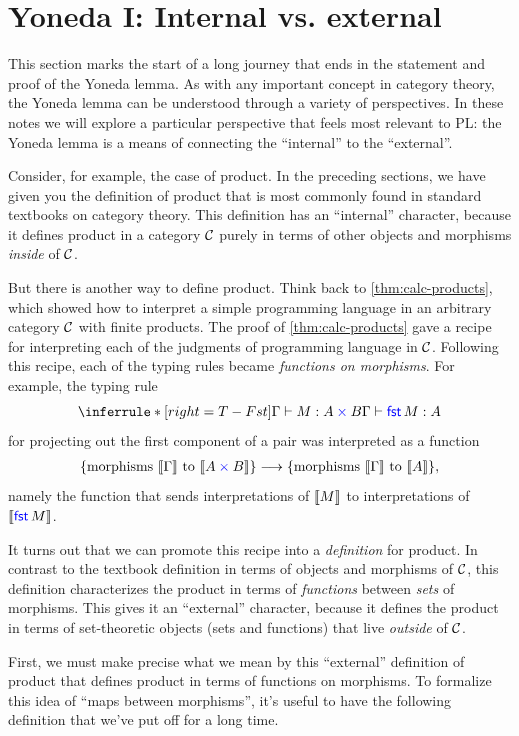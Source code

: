 \chapter{Yoneda I: Internal vs. external}

This section marks the start of a long journey that ends in
the statement and proof of the Yoneda lemma.
As with any important concept in category theory, the Yoneda lemma
can be understood through a variety of perspectives. In these
notes we will explore a particular perspective that feels most
relevant to PL: the Yoneda lemma is a means of connecting
the ``internal'' to the ``external''.

Consider, for example, the case of product.
In the preceding sections, we have given you the definition of product
that is most commonly found in standard textbooks on category theory.
This definition has an ``internal'' character, because it defines
product in a category \(\mathcal C\) purely in terms of
other objects and morphisms \emph{inside} of \(\mathcal C\).

But there is another way to define product.
Think back to \cref{thm:calc-products},
which showed how to interpret a simple programming language
in an arbitrary category \(\mathcal C\) with finite products.
The proof of \cref{thm:calc-products} gave a recipe
for interpreting each of the judgments of programming language
in \(\mathcal C\). Following this recipe,
each of the typing rules became
\emph{functions on morphisms}. For example, the typing rule
\[
\inferrule*[right=T-Fst]{\Gamma \vdash M : A \pltimes B}{\Gamma \vdash \plfst{M} : A}
\]
for projecting out the first component of a pair
was interpreted as a function
\begin{align*}
  \{\text{morphisms \(\left\llbracket \Gamma\right\rrbracket\) to \(\left\llbracket A\mathbin{{\color{blue}\times}}B\right\rrbracket\)}\}
  \longrightarrow
  \{\text{morphisms \(\left\llbracket \Gamma\right\rrbracket\) to \(\left\llbracket A\right\rrbracket\)} \},
\end{align*}
namely the function
that sends interpretations of \(\left\llbracket M\right\rrbracket\) to interpretations of \(\left\llbracket \mathsf{{\color{blue}fst}}\,M\right\rrbracket\).

It turns out that we can promote this recipe into a \emph{definition} for product.
In contrast to the textbook definition in terms of objects and morphisms
of \(\mathcal C\), this definition characterizes the product in terms of \emph{functions} between
\emph{sets} of morphisms. This gives it an ``external'' character,
because it defines the product in terms of set-theoretic objects (sets and functions)
that live \emph{outside} of \(\mathcal C\).

First, we must make precise what we mean by this ``external'' definition of product
that defines product in terms of functions on morphisms.
To formalize this idea of ``maps between morphisms'',
  it's useful to have the following definition that we've put off for a long time.

